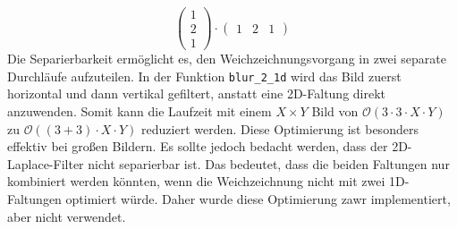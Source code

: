 \documentclass[course=erap]{aspdoc}
\begin{document}
\begin{itemize}
\[         \begin{pmatrix}  1 \\ 2 \\ 1 \end{pmatrix} \cdot \begin{pmatrix} 1 & 2 & 1 \end{pmatrix}
\]
Die Separierbarkeit ermöglicht es, den Weichzeichnungsvorgang in zwei separate Durchläufe aufzuteilen. In der Funktion \texttt{blur\_2\_1d} wird das Bild zuerst horizontal und dann vertikal gefiltert, anstatt eine 2D-Faltung direkt anzuwenden. Somit kann die Laufzeit mit einem $X\times Y$ Bild von $\mathcal{O}(3\cdot 3\cdot X\cdot Y)$ zu $\mathcal{O}((3+3)\cdot X\cdot Y)$ reduziert werden\cite{separableFilter}. Diese Optimierung ist besonders effektiv bei großen Bildern. \newline
Es sollte jedoch bedacht werden, dass der 2D-Laplace-Filter nicht separierbar ist. Das bedeutet, dass die beiden Faltungen nur kombiniert werden könnten, wenn die Weichzeichnung nicht mit zwei 1D-Faltungen optimiert würde. Daher wurde diese Optimierung zawr implementiert, aber nicht verwendet.
\end{itemize}
\end{document}
